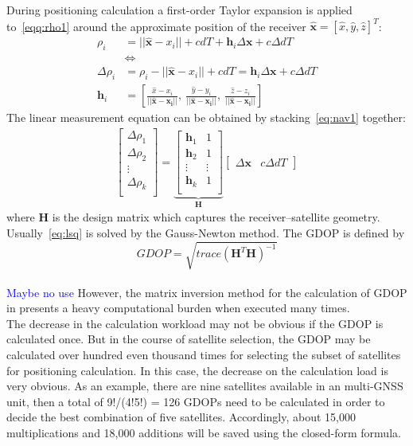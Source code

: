 \documentclass[a4paper]{report}
\begin{document}
During positioning calculation a first-order Taylor expansion is applied to~\eqref{eqq:rho1} around the approximate position of the receiver $\mathbf{\hat{x}}=[\hat{x}, \hat{y}, \hat{z}]^T$:
\begin{align}
\rho_i &= ||\mathbf{\hat{x}}-x_i||+cdT + \mathbf{h}_i \Delta \mathbf{x} + c\Delta dT\\
& \Leftrightarrow \nonumber \\
\Delta \rho_i &= \rho_i - ||\mathbf{\hat{x}}-x_i||+cdT = \mathbf{h}_i \Delta \mathbf{x} + c\Delta dT\\
\mathbf{h}_i  &= \left[
\frac{\hat{x}-x_i}{||\mathbf{\hat{x}}-\mathbf{x_i}||},\ 
\frac{\hat{y}-y_i}{||\mathbf{\hat{x}}-\mathbf{x_i}||},\ 
\frac{\hat{z}-z_i}{||\mathbf{\hat{x}}-\mathbf{x_i}||}
\right]
\label{eq:nav1}
\end{align}
The linear measurement equation can be obtained by stacking~\eqref{eq:nav1} together:
\begin{align}
\left[
\begin{matrix}
\Delta \rho_1 \\
\Delta \rho_2 \\
\vdots \\
\Delta \rho_k \\
\end{matrix}
\right] = 
\underbrace{
\left[
\begin{matrix}
\mathbf{h}_1 & 1 \\
\mathbf{h}_2 & 1 \\
\vdots & \vdots \\
\mathbf{h}_k & 1 \\
\end{matrix}
\right] }_{\mathbf{H}}
 \left[
\begin{matrix}
\Delta \mathbf{x} & c\Delta dT
\end{matrix}
\right] 
\label{eq:lsq}
\end{align}
where $\mathbf{H}$ is the design matrix which captures the receiver–satellite geometry. Usually~\eqref{eq:lsq} is solved by the Gauss-Newton method. The GDOP is defined by
\begin{equation}
GDOP=\sqrt{trace(\mathbf{H}^T\mathbf{H})^{-1}}
\end{equation}
\\
\textcolor{blue}{Maybe no use}
However, the matrix inversion method for the calculation of GDOP in presents a heavy computational burden when executed many times. \\
The decrease in the calculation workload may not be obvious if the GDOP is calculated once. But in the course of satellite selection, the GDOP may be calculated over
hundred even thousand times for selecting the subset of satellites for positioning calculation. In this case, the decrease on the calculation load is very obvious. As an example,
there are nine satellites available in an multi-GNSS unit, then a total of 9!/(4!5!) = 126 GDOPs need to be calculated in order to decide the best combination of five satellites. Accordingly, about 15,000 multiplications and 18,000 additions will be saved using the closed-form
formula.
\end{document}
